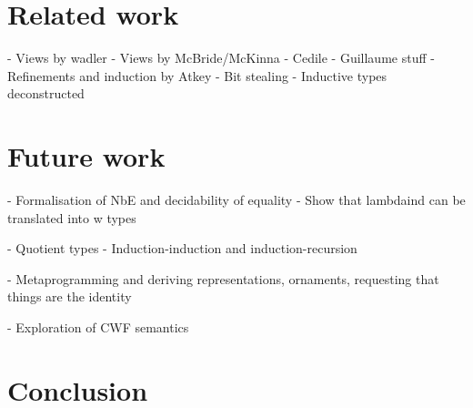 \section{Related work}

- Views by wadler
- Views by McBride/McKinna
- Cedile
- Guillaume stuff
- Refinements and induction by Atkey
- Bit stealing
- Inductive types deconstructed

\section{Future work}

- Formalisation of NbE and decidability of equality
- Show that lambdaind can be translated into w types

- Quotient types
- Induction-induction and induction-recursion

- Metaprogramming and deriving representations, ornaments, requesting that things are the identity

- Exploration of CWF semantics

\section{Conclusion}

